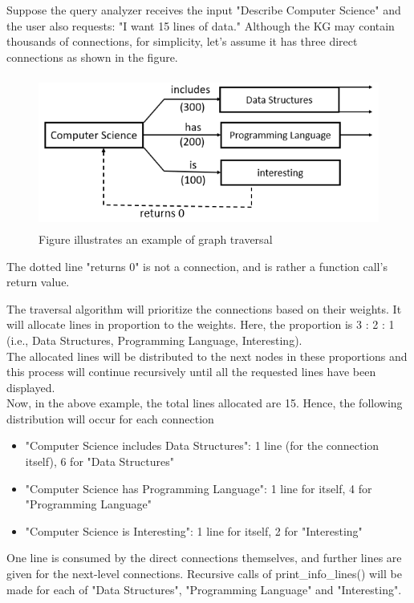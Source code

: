 \documentclass[conference]{IEEEtran}
\begin{document}
Suppose the query analyzer receives the input "Describe Computer Science" and the user also requests: "I want 15 lines of data."
Although the KG may contain thousands of connections, for simplicity, let's assume it has three direct connections as shown in the figure.

\begin{figure}[htbp]
\centering
\includegraphics[width=1.0\linewidth,height=5cm]{kg_explanation_example.png}
\caption{Figure illustrates an example of graph traversal}
\label{fig}
\end{figure}

The dotted line "returns 0" is not a connection, and is rather a function call's return value.



The traversal algorithm will prioritize the connections based on their weights. It will allocate lines in proportion to the weights. Here, the proportion is 3 : 2 : 1 (i.e., Data Structures, Programming Language, Interesting).\\ The allocated lines will be distributed to the next nodes in these proportions and this process will continue recursively until all the requested lines have been displayed.\\


Now, in the above example, the total lines allocated are 15. Hence, the following distribution will occur for each connection
\begin{itemize}
\item "Computer Science includes Data Structures": 1 line (for the connection itself), 6 for "Data Structures"
\item "Computer Science has Programming Language": 1 line for itself, 4 for "Programming Language"
\item "Computer Science is Interesting": 1 line for itself, 2 for "Interesting"
\end{itemize}

One line is consumed by the direct connections themselves, and further lines are given for the next-level connections.
Recursive calls of print\_info\_lines() will be made for each of "Data Structures", "Programming Language" and "Interesting".\\
\end{document}
